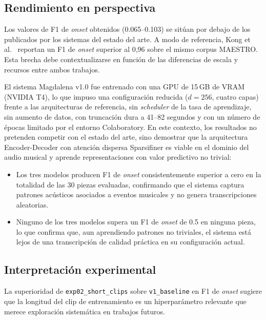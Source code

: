 \subsection{Rendimiento en perspectiva}

Los valores de F1 de \textit{onset} obtenidos (0.065--0.103) se
sitúan por debajo de los publicados por los sistemas del estado del
arte. A modo de referencia, Kong et al.\ \cite{kong2021high} reportan
un F1 de \textit{onset} superior al 0,96 sobre el mismo corpus
MAESTRO. Esta brecha debe contextualizarse en función de las
diferencias de escala y recursos entre ambos trabajos.

El sistema Magdalena v1.0 fue entrenado con una GPU de 15\,GB de
VRAM (NVIDIA T4), lo que impuso una configuración reducida
($d = 256$, cuatro capas) frente a las arquitecturas de referencia,
sin \textit{scheduler} de la tasa de aprendizaje, sin aumento de
datos, con truncación dura a 41--82 segundos y con un número de
épocas limitado por el entorno Colaboratory. En este contexto, los
resultados no pretenden competir con el estado del arte, sino
demostrar que la arquitectura Encoder-Decoder con atención dispersa
Sparsifiner es viable en el dominio del audio musical y aprende
representaciones con valor predictivo no trivial:

\begin{itemize}
    \item Los tres modelos producen F1 de \textit{onset}
    consistentemente superior a cero en la totalidad de las 30 piezas
    evaluadas, confirmando que el sistema captura patrones acústicos
    asociados a eventos musicales y no genera transcripciones
    aleatorias.
    \item Ninguno de los tres modelos supera un F1 de \textit{onset}
    de 0.5 en ninguna pieza, lo que confirma que, aun aprendiendo
    patrones no triviales, el sistema está lejos de una transcripción
    de calidad práctica en su configuración actual.
\end{itemize}

\subsection{Interpretación experimental}

La superioridad de \texttt{exp02\_short\_clips} sobre
\texttt{v1\_baseline} en F1 de \textit{onset} sugiere que la longitud
del clip de entrenamiento es un hiperparámetro relevante que merece
exploración sistemática en trabajos futuros.

